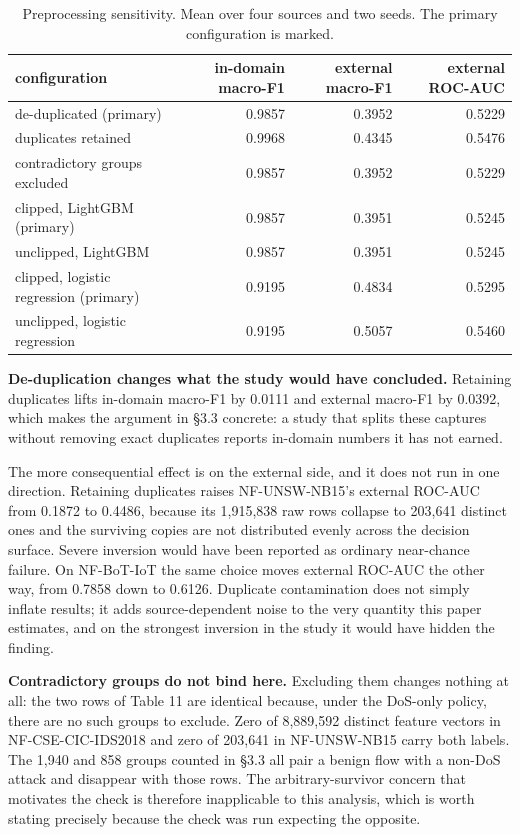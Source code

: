 \documentclass[journal]{IEEEtran}
\begin{document}
\begin{table}[htbp]\centering\scriptsize
\caption{Preprocessing sensitivity. Mean over four sources and two seeds. The primary configuration is marked.}
\begin{tabular}{lrrr}
\toprule
configuration & in-domain macro-F1 & external macro-F1 & external ROC-AUC \\
\midrule
de-duplicated (primary) & 0.9857 & 0.3952 & 0.5229 \\
duplicates retained & 0.9968 & 0.4345 & 0.5476 \\
contradictory groups excluded & 0.9857 & 0.3952 & 0.5229 \\
clipped, LightGBM (primary) & 0.9857 & 0.3951 & 0.5245 \\
unclipped, LightGBM & 0.9857 & 0.3951 & 0.5245 \\
clipped, logistic regression (primary) & 0.9195 & 0.4834 & 0.5295 \\
unclipped, logistic regression & 0.9195 & 0.5057 & 0.5460 \\
\bottomrule
\end{tabular}
\end{table}

\textbf{De-duplication changes what the study would have concluded.} Retaining duplicates lifts in-domain macro-F1 by 0.0111 and external macro-F1 by 0.0392, which makes the argument in §3.3 concrete: a study that splits these captures without removing exact duplicates reports in-domain numbers it has not earned.

The more consequential effect is on the external side, and it does not run in one direction. Retaining duplicates raises NF-UNSW-NB15's external ROC-AUC from 0.1872 to 0.4486, because its 1,915,838 raw rows collapse to 203,641 distinct ones and the surviving copies are not distributed evenly across the decision surface. Severe inversion would have been reported as ordinary near-chance failure. On NF-BoT-IoT the same choice moves external ROC-AUC the other way, from 0.7858 down to 0.6126. Duplicate contamination does not simply inflate results; it adds source-dependent noise to the very quantity this paper estimates, and on the strongest inversion in the study it would have hidden the finding.

\textbf{Contradictory groups do not bind here.} Excluding them changes nothing at all: the two rows of Table 11 are identical because, under the DoS-only policy, there are no such groups to exclude. Zero of 8,889,592 distinct feature vectors in NF-CSE-CIC-IDS2018 and zero of 203,641 in NF-UNSW-NB15 carry both labels. The 1,940 and 858 groups counted in §3.3 all pair a benign flow with a non-DoS attack and disappear with those rows. The arbitrary-survivor concern that motivates the check is therefore inapplicable to this analysis, which is worth stating precisely because the check was run expecting the opposite.
\end{document}
